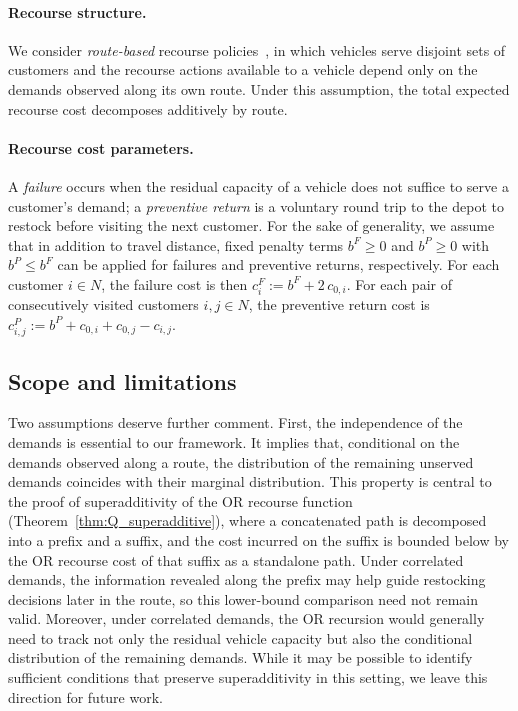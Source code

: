 \documentclass{article}
\begin{document}
{\paragraph{Recourse structure.}
We consider \emph{route-based} recourse policies~\cite{dror1986stochastic}, in which vehicles serve disjoint sets of customers and the recourse actions available to a vehicle depend only on the demands observed along its own route. Under this assumption, the total expected recourse cost decomposes additively by route.
 
\paragraph{Recourse cost parameters.}
A \emph{failure} occurs when the residual capacity of a vehicle does not suffice to serve a customer's demand; a \emph{preventive return} is a voluntary round trip to the depot to restock before visiting the next customer. For the sake of generality, we assume that in addition to travel distance, fixed penalty terms $b^F \geq 0$ and $b^P \geq 0$ with $b^P \leq b^F$ can be applied for failures and preventive returns, respectively. For each customer $i \in N$, the failure cost is then $c^F_i := b^F + 2\,c_{0,i}$. For each pair of consecutively visited customers $i,j \in N$, the preventive return cost is $c^P_{i,j} := b^P + c_{0,i} + c_{0,j} - c_{i,j}$.

\subsection{Scope and limitations}\label{subsec:limitations}
 
Two assumptions deserve further comment. First, the independence of the demands is essential to our framework. It implies that, conditional on the demands observed along a route, the distribution of the remaining unserved demands coincides with their marginal distribution. This property is central to the proof of superadditivity of the OR recourse function (Theorem~\ref{thm:Q_superadditive}), where a concatenated path is decomposed into a prefix and a suffix, and the cost incurred on the suffix is bounded below by the OR recourse cost of that suffix as a standalone path. Under correlated demands, the information revealed along the prefix may help guide restocking decisions later in the route, so this lower-bound comparison need not remain valid. Moreover, under correlated demands, the OR recursion would generally need to track not only the residual vehicle capacity but also the conditional distribution of the remaining demands. While it may be possible to identify sufficient conditions that preserve superadditivity in this setting, we leave this direction for future work.

}
\end{document}
